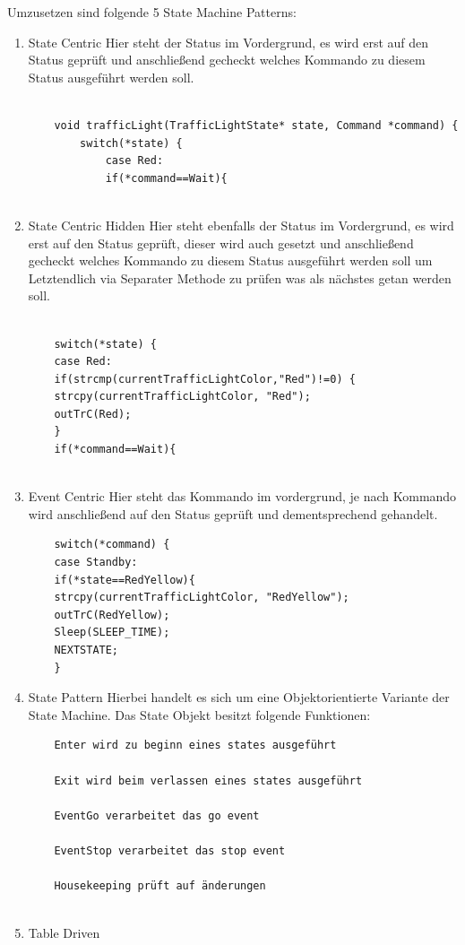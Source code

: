 \documentclass[12pt,a4paper,draft]{report}
\begin{document}
Umzusetzen sind folgende 5 State Machine Patterns:
\newline
\begin{enumerate}
	\item State Centric \newline
	Hier steht der Status im Vordergrund, es wird erst auf den Status geprüft und anschließend gecheckt welches Kommando zu diesem Status ausgeführt werden soll.
	\begin{verbatim}

	void trafficLight(TrafficLightState* state, Command *command) {
		switch(*state) {
			case Red:
			if(*command==Wait){
				
	\end{verbatim}
	\item State Centric Hidden \newline
	Hier steht ebenfalls der Status im Vordergrund, es wird erst auf den Status geprüft, dieser wird auch gesetzt und anschließend gecheckt welches Kommando zu diesem Status ausgeführt werden soll um Letztendlich via Separater Methode zu prüfen was als nächstes getan werden soll.  
	\begin{verbatim}
	
	switch(*state) {
	case Red:
	if(strcmp(currentTrafficLightColor,"Red")!=0) {
	strcpy(currentTrafficLightColor, "Red");
	outTrC(Red);
	}
	if(*command==Wait){
	
	\end{verbatim}
	\item Event Centric \newline
	Hier steht das Kommando im vordergrund, je nach Kommando wird anschließend auf den Status geprüft und dementsprechend gehandelt.
	\begin{verbatim}
	switch(*command) {
	case Standby:
	if(*state==RedYellow){
	strcpy(currentTrafficLightColor, "RedYellow");
	outTrC(RedYellow);
	Sleep(SLEEP_TIME);
	NEXTSTATE;
	}
	\end{verbatim}
	
	\item State Pattern \newline
	Hierbei handelt es sich um eine Objektorientierte Variante der State Machine.\newline
	Das State Objekt besitzt folgende Funktionen:\newline
	\begin{verbatim}
	Enter wird zu beginn eines states ausgeführt
	
	Exit wird beim verlassen eines states ausgeführt
	
	EventGo verarbeitet das go event
	
	EventStop verarbeitet das stop event
	
	Housekeeping prüft auf änderungen
	
	\end{verbatim}
	
	\item Table Driven \newline
	
\end{enumerate}
\end{document}
